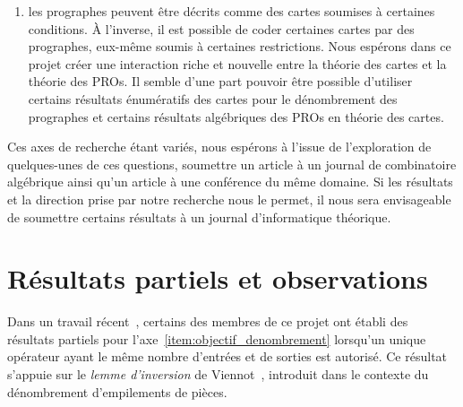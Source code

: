 \documentclass[10pt,reqno]{amsart}
\numberwithin{equation}{subsection}
\begin{document}
\begin{enumerate}[fullwidth,label={\bf (\arabic*)}]
    \item \label{item:objectif_cartes}
    les prographes peuvent être décrits comme des cartes soumises à 
    certaines conditions. À l'inverse, il est possible de coder certaines
    cartes par des prographes, eux-même soumis à certaines restrictions.
    Nous espérons dans ce projet créer une interaction riche et nouvelle 
    entre la théorie des cartes et la théorie des PROs. Il semble d'une 
    part pouvoir être possible d'utiliser certains résultats énumératifs 
    des cartes pour le dénombrement des prographes et certains résultats 
    algébriques des PROs en théorie des cartes.
\end{enumerate}

Ces axes de recherche étant variés, nous espérons à l'issue de 
l'exploration de quelques-unes de ces questions, soumettre un article à 
un journal de combinatoire algébrique ainsi qu'un article à une 
conférence du même domaine. Si les résultats et la direction prise
par notre recherche nous le permet, il nous sera envisageable de soumettre
certains résultats à un journal d'informatique théorique.

\section{Résultats partiels et observations}
Dans un travail récent~\cite{BG14}, certains des membres de ce projet 
ont établi des résultats partiels pour 
l'axe~\eqref{item:objectif_denombrement} lorsqu'un unique opérateur 
ayant le même nombre d'entrées et de sorties est autorisé. Ce résultat 
s'appuie sur le {\em lemme d'inversion} de Viennot~\cite{Vie86},
introduit dans le contexte du dénombrement d'empilements de pièces. 

\end{document}
